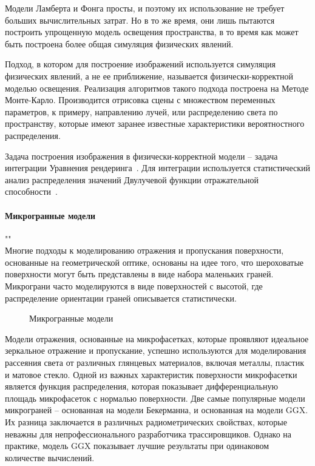 Модели Ламберта и Фонга просты, и поэтому их использование не требует больших вычислительных
затрат. Но в то же время, они лишь пытаются построить упрощенную модель освещения пространства, в то время как может быть построена более общая симуляция физических явлений.

Подход, в котором для построение изображений используется симуляция физических 
явлений, а не ее приближение, называется физически-корректной моделью освещения.
Реализация алгоритмов такого подхода построена на Методе Монте-Карло. Производится
отрисовка сцены с множеством переменных параметров, к примеру, направлению лучей,
или распределению света по пространству, которые имеют заранее известные 
характеристики вероятностного распределения.

Задача построения изображения в физически-корректной модели -- задача 
интеграции Уравнения рендеринга~\cite{EoR}. Для интеграции используется
статистический анализ распределения значений Двулучевой функции отражательной 
способности~\cite{PBRT3e}.

\paragraph{Микрогранные модели}""\\
Многие подходы к моделированию отражения и пропускания поверхности, основанные 
на геометрической оптике, основаны на идее того, что шероховатые поверхности 
могут быть представлены в виде набора маленьких граней. Микрограни часто моделируются 
в виде поверхностей с высотой, где распределение ориентации граней описывается статистически.

\begin{figure}[!ht]
  \centering
  
  \caption{Микрогранные модели}
\end{figure}

Модели отражения, основанные на микрофасетках, которые проявляют идеальное 
зеркальное отражение и пропускание, успешно используются для моделирования 
рассеяния света от различных глянцевых материалов, включая металлы, пластик 
и матовое стекло.
Одной из важных характеристик поверхности микрофасетки является функция 
распределения, которая показывает дифференциальную площадь микрофасеток 
с нормалью поверхности. Две самые популярные модели микрограней -- 
основанная на модели Бекерманна, и основанная на модели GGX. Их разница 
заключается в различных радиометрических свойствах, которые неважны
для непрофессионального разработчика трассировщиков. Однако на практике,
модель GGX показывает лучшие результаты при одинаковом количестве вычислений.
~\cite{PBRT3e}~\cite{MMfRtRS}

